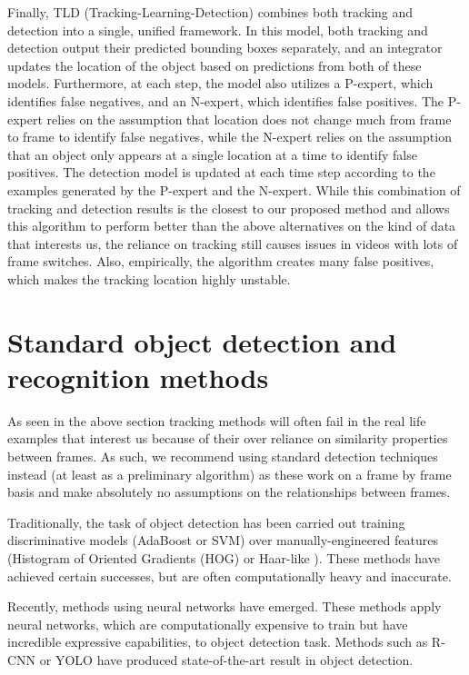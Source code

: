 \documentclass{article}
\begin{document}
Finally, TLD (Tracking-Learning-Detection) \cite{TLD} combines both tracking and detection into a single, unified framework.
In this model, both tracking and detection output their predicted bounding boxes
separately, and an integrator updates the location of the object based on
predictions from both of these models. Furthermore, at each step, the model
also utilizes a P-expert, which identifies false negatives, and an N-expert,
which identifies false positives. The P-expert relies on the assumption
that location does not change much from frame to frame to identify false negatives,
while the N-expert relies on the assumption that an object only appears at
a single location at a time to identify false positives. The detection model
is updated at each time step according to the examples generated by the P-expert and
the N-expert. While this combination of tracking and detection results is the closest to our proposed
method and allows this algorithm to perform better than the above alternatives on the kind of 
data that interests us, the reliance on tracking still causes issues in videos with lots of frame switches.
Also, empirically, the algorithm creates many false positives, which makes the tracking location highly unstable.


\section{Standard object detection and recognition methods}

As seen in the above section tracking methods will often fail in the real life examples that interest us because of their over reliance 
on similarity properties between frames. As such, we recommend using standard detection techniques instead (at least as a preliminary algorithm)
as these work on a frame by frame basis and make absolutely no assumptions on the relationships between frames.

Traditionally, the task of object detection has been carried out training
discriminative models (AdaBoost or SVM) over manually-engineered features (Histogram of Oriented Gradients (HOG) \cite{hog}
or Haar-like \cite{haar}). These methods have achieved certain successes, but
are often computationally heavy and inaccurate.

Recently, methods using neural networks have emerged. These methods apply neural
networks, which are computationally expensive to train but have incredible
expressive capabilities, to object detection task. Methods such as
R-CNN \cite{rcnn} or YOLO \cite{yolo} have produced state-of-the-art result
in object detection.
\end{document}
